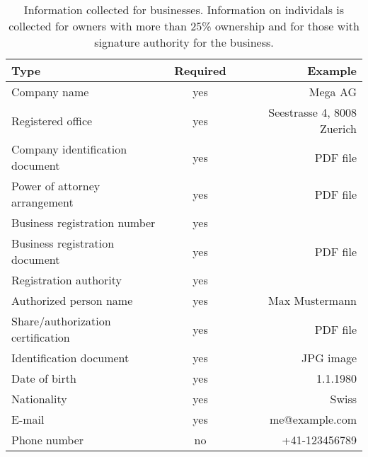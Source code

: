 \begin{table}
  \caption{Information collected for businesses. Information on individals is
    collected for owners with more than 25\% ownership and for those with
    signature authority for the business.}
  \label{table:proc:kyb:business}
  \begin{center}
    \begin{tabular}{l|c|r}
      {\bf Type}                        & {\bf Required} & {\bf Example}        \\ \hline \hline
      Company name                      & yes        & Mega AG \\
      Registered office                 & yes        & Seestrasse 4, 8008 Zuerich \\
      Company identification document   & yes        & PDF file \\
      Power of attorney arrangement     & yes        & PDF file  \\
      Business registration number      & yes        &  \\
      Business registration document    & yes        & PDF file \\
      Registration authority            & yes        &  \\ \hline
      Authorized person name            & yes        & Max Mustermann \\
      Share/authorization certification & yes        & PDF file \\
      Identification document           & yes        & JPG image \\
      Date of birth                     & yes        & 1.1.1980  \\
      Nationality                       & yes        & Swiss     \\
      E-mail                            & yes        & me@example.com \\
      Phone number                      & no         & +41-123456789  \\
  \end{tabular}
  \end{center}
\end{table}
